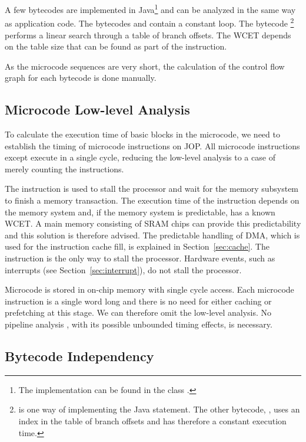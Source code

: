 A few bytecodes are implemented in Java\footnote{The implementation
can be found in the class .} and can be
analyzed in the same way as application code. The bytecodes
 and  contain a constant loop. The bytecode
\footnote{ is one way of
implementing the Java  statement. The other
bytecode, , uses an index in the table of
branch offsets and has therefore a constant execution time.} performs
a linear search through a table of branch offsets. The WCET depends
on the table size that can be found as part of the instruction.

As the microcode sequences are very short, the calculation of the
control flow graph for each bytecode is done manually.

\subsection{Microcode Low-level Analysis}

To calculate the execution time of basic blocks in the microcode, we
need to establish the timing of microcode instructions on JOP. All
microcode instructions except  execute in a single cycle,
reducing the low-level analysis to a case of merely counting the
instructions.

The  instruction is used to stall the processor and wait
for the memory subsystem to finish a memory transaction. The
execution time of the  instruction depends on the memory
system and, if the memory system is predictable, has a known WCET. A
main memory consisting of SRAM chips can provide this predictability
and this solution is therefore advised. The predictable handling of
DMA, which is used for the instruction cache fill, is explained in
Section~\ref{sec:cache}. The  instruction is the only way
to stall the processor. Hardware events, such as interrupts (see
Section~\ref{sec:interrupt}), do not stall the processor.

Microcode is stored in on-chip memory with single cycle access. Each
microcode instruction is a single word long and there is no need for
either caching or prefetching at this stage. We can therefore omit
the low-level analysis. No pipeline analysis \cite{EngblomPhD}, with
its possible unbounded timing effects, is necessary.

\subsection{Bytecode Independency}

